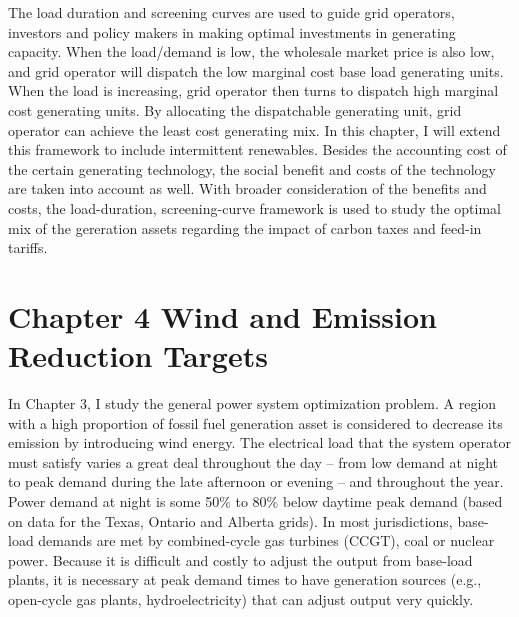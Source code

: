 The load duration and screening 
curves are used to guide grid operators, investors and policy makers in
making optimal investments in generating capacity. When the load/demand
is low, the wholesale market price is also low, and grid operator will
dispatch the low marginal cost base load generating units. When the load
is increasing, grid operator then turns to dispatch high marginal cost
generating units. By allocating the dispatchable generating unit, grid
operator can achieve the least cost generating mix. In this chapter, I
will extend this framework to include intermittent renewables. Besides
the accounting cost of the certain generating technology, the social
benefit and costs of the technology are taken into account as well. With
broader consideration of the benefits and costs, the load-duration,
screening-curve framework is used to study the optimal mix of the
gereration assets regarding the impact of carbon taxes and feed-in
tariffs.

\section{Chapter 4 Wind and Emission Reduction
	Targets}\label{chapter-4-wind-and-emission-reduction-targets}

In Chapter 3, I study the general power system optimization problem. A
region with a high proportion of fossil fuel generation asset is
considered to decrease its emission by introducing wind energy. The
electrical load that the system operator must satisfy varies a great
deal throughout the day -- from low demand at night to peak demand
during the late afternoon or evening -- and throughout the year. Power
demand at night is some 50\% to 80\% below daytime peak demand (based on
data for the Texas, Ontario and Alberta grids). In most jurisdictions,
base-load demands are met by combined-cycle gas turbines (CCGT), coal or
nuclear power. Because it is difficult and costly to adjust the output
from base-load plants, it is necessary at peak demand times to have
generation sources (e.g., open-cycle gas plants, hydroelectricity) that
can adjust output very quickly.

